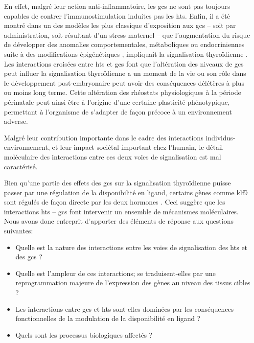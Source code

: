 \documentclass[../main.tex]{subfiles}
\begin{document}
		En effet, malgré leur action anti-inflammatoire, les \glspl{gc} ne sont pas toujours capables de contrer l'immunostimulation induites pas les \glspl{ht}.
		Enfin, il a été montré dans un des modèles les plus classique d'exposition aux \glspl{gc} – soit par administration, soit résultant d'un stress maternel – que l'augmentation du risque de développer des anomalies comportementales, métaboliques ou endocriniennes suite à des modifications épigénétiques \cite{Weaver2004}, impliquait la signalisation thyroïdienne \citep{Hellstrom2012}.
		Les interactions croisées entre \glspl{ht} et \glspl{gc} font que l'altération des niveaux de \glspl{gc} peut influer la signalisation thyroïdienne a un moment de la vie ou son rôle dans le développement post-embryonaire peut avoir des conséquences délétères à plus ou moins long terme.
		Cette altération des rhéostats physiologiques à la période périnatale peut ainsi être à l'origine d'une certaine plasticité phénotypique, permettant à l'organisme de s'adapter de façon précoce à un environnement adverse.
		\par
		Malgré leur contribution importante dans le cadre des interactions individus-environnement, et leur impact sociétal important chez l'humain, le détail moléculaire des interactions entre ces deux voies de signalisation est mal caractérisé.
		\par
		Bien qu'une partie des effets des \glspl{gc} sur la signalisation thyroïdienne puisse passer par une régulation de la disponibilité en ligand, certains gènes comme \gls{klf9} sont régulés de façon directe par les deux hormones \citep{Denver2009b,Bagamasbad2012}.
		Ceci suggère que les interactions \glspl{ht} – \glspl{gc} font intervenir un ensemble de mécanismes moléculaires. 
		Nous avons donc entreprit d'apporter des éléments de réponse aux questions suivantes:
		\begin{itemize}
			\item
				Quelle est la nature des interactions entre les voies de signalisation des \glspl{ht} et des \glspl{gc} ? 
			\item
				Quelle est l'ampleur de ces interactions; se traduisent-elles par une reprogrammation majeure de l'expression des gènes au niveau des tissus cibles ?
			\item
				Les interactions entre \glspl{gc} et \glspl{ht} sont-elles dominées par les conséquences fonctionnelles de la modulation de la disponibilité en ligand ?
			\item
				Quels sont les processus biologiques affectés ?
		\end{itemize}
\end{document}
